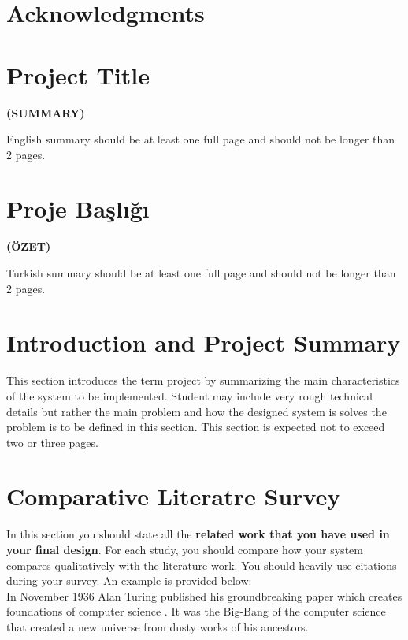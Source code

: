 \documentclass[a4paper, 12pt, titlepage]{article}
\newcommand{\thetitle}{Project Title}
\newcommand{\theturkishtitle}{Proje Başlığı}
\begin{document}
\newpage
\section*{Acknowledgments}

\newpage
\section*{\centering\thetitle}
\centerline{\fontsize{16pt}{21.6pt}\sffamily\bfseries (SUMMARY)}
English summary should be at least one full page and should not be longer than 2 pages. 

\newpage
\section*{\centering\theturkishtitle}
\centerline{\fontsize{16pt}{21.6pt}\sffamily\bfseries (ÖZET)}
Turkish summary should be at least one full page and should not be longer than 2 pages.

\newpage
\tableofcontents
\newpage

\section{Introduction and Project Summary}
This section introduces the term project by summarizing the main characteristics of the system to be implemented. Student may include very rough technical details but rather the main problem and how the designed system is solves the problem is to be defined in this section. This section is expected not to exceed two or three pages.
\newpage

\section{Comparative Literatre Survey}
In this section you should state all the \textbf{related work that you have used in your final design}. For each study, you should compare how your system compares qualitatively with the literature work. You should heavily use citations during your survey. An example is provided below: \\

In November 1936 Alan Turing published his groundbreaking paper which creates foundations of computer science \cite{turing1937computability}. It was the Big-Bang of the computer science that created a new universe from dusty works of his ancestors.\\
\end{document}
